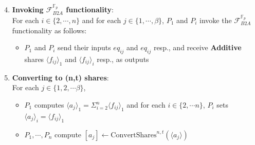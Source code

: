 \begin{frame}

    \begin{enumerate}
        \setcounter{enumi}{3}\item \textbf{Invoking $\mathcal{F}_{B2A}^{\mathbb{F}_p}$ functionality}: \\
        
        For each $i \in \{2,\cdots,n \}$ and for each $j \in \{1,\cdots,\beta \}$, $P_1 $ and $P_i$ invoke the $\mathcal{F}_{B2A}^{\mathbb{F}_p}$ functionality as follows:

        \begin{itemize}
            \item $P_1$ and $P_i$ send their inputs $eq_{ij}$ and $eq_{ij}$ resp., and receive \textbf{Additive} shares $\langle f_{ij} \rangle_1$
            and $\langle f_{ij} \rangle_i$ resp., as outputs
        \end{itemize}

        \vspace{0.5cm}

        \item \textbf{Converting to (n,t) shares}: \\
        
        For each $j \in \{1,2,\cdots \beta \}$,
        
        \begin{itemize}
            \item $P_1$ computes $\langle a_j \rangle_1 = \Sigma_{i=2}^n \langle f_{ij} \rangle_1$ and for each $i \in \{2,\cdots n \}$, $P_i$ sets  $\langle a_j \rangle_i = \langle f_{ij} \rangle_1 $
            \item $P_1,\cdots,P_n$ compute $[a_j] \leftarrow \text{ConvertShares}^{n,t}(\langle a_j \rangle)$
        \end{itemize}

    \end{enumerate}

\end{frame}

